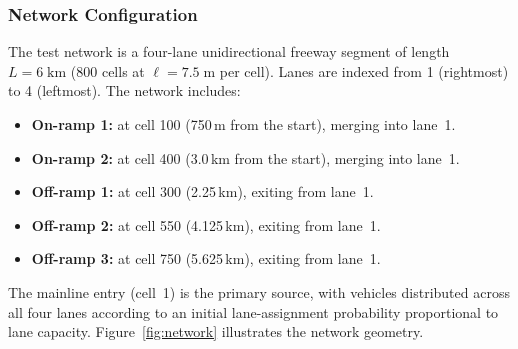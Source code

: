 \documentclass[review,authoryear]{elsarticle}
\begin{document}
\subsubsection{Network Configuration}

The test network is a four-lane unidirectional freeway segment of length $L = 6\;\text{km}$ (800 cells at $\ell = 7.5\;\text{m}$ per cell). Lanes are indexed from 1 (rightmost) to 4 (leftmost). The network includes:
\begin{itemize}
    \item \textbf{On-ramp 1:} at cell 100 (750\,m from the start), merging into lane~1.
    \item \textbf{On-ramp 2:} at cell 400 (3.0\,km from the start), merging into lane~1.
    \item \textbf{Off-ramp 1:} at cell 300 (2.25\,km), exiting from lane~1.
    \item \textbf{Off-ramp 2:} at cell 550 (4.125\,km), exiting from lane~1.
    \item \textbf{Off-ramp 3:} at cell 750 (5.625\,km), exiting from lane~1.
\end{itemize}

The mainline entry (cell~1) is the primary source, with vehicles distributed across all four lanes according to an initial lane-assignment probability proportional to lane capacity. Figure~\ref{fig:network} illustrates the network geometry.
\end{document}
